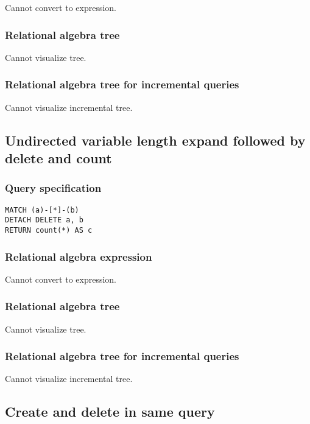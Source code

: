 Cannot convert to expression.

\subsubsection*{Relational algebra tree}

Cannot visualize tree.

\subsubsection*{Relational algebra tree for incremental queries}

Cannot visualize incremental tree.

\subsection{Undirected variable length expand followed by delete and count}

\subsubsection*{Query specification}

\begin{lstlisting}
MATCH (a)-[*]-(b)
DETACH DELETE a, b
RETURN count(*) AS c
\end{lstlisting}

\subsubsection*{Relational algebra expression}

Cannot convert to expression.

\subsubsection*{Relational algebra tree}

Cannot visualize tree.

\subsubsection*{Relational algebra tree for incremental queries}

Cannot visualize incremental tree.

\subsection{Create and delete in same query}

